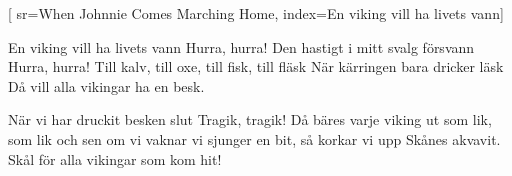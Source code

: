 [
		sr={When Johnnie Comes Marching Home},
		index={En viking vill ha livets vann}]

\beginverse
En viking vill ha livets vann
Hurra, hurra!
Den hastigt i mitt svalg försvann
Hurra, hurra!
Till kalv, till oxe, till fisk, till fläsk
När kärringen bara dricker läsk
Då vill alla vikingar ha en besk. 
\endverse

\beginverse
När vi har druckit besken slut
Tragik, tragik!
Då bäres varje viking ut
som lik, som lik
och sen om vi vaknar vi sjunger en bit,
så korkar vi upp Skånes akvavit.
Skål för alla vikingar som kom hit!
\endverse
\endsong